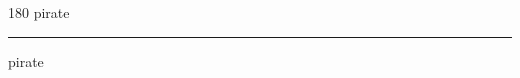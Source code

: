 
\begin{frame}
\begin{center}
\begin{turn}{180}
{\fontsize{2.5cm}{1em}\selectfont pirate}
\end{turn}
\vspace{1em}\par  
\hrule
\vspace{1em}\par  
{\fontsize{2.5cm}{1em}\selectfont pirate}
\end{center}
\end{frame}
